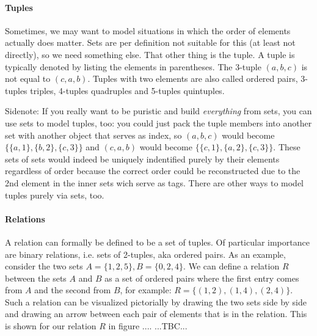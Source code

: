 \paragraph{Tuples}
Sometimes, we may want to model situations in which the order of elements actually does matter. Sets are per definition not suitable for this (at least not directly), so we need something else. That other thing is the tuple. A tuple is typically denoted by listing the elements in parentheses. The 3-tuple $(a,b,c)$ is not equal to $(c,a,b)$. Tuples with two elements are also called ordered pairs, 3-tuples triples, 4-tuples quadruples and 5-tuples quintuples.

\medskip 
Sidenote: If you really want to be puristic and build \emph{everything} from sets, you can use sets to model tuples, too: you could just pack the tuple members into another set with another object that serves as index, so $(a,b,c)$ would become $\{\{a,1\},\{b,2\},\{c,3\}\}$ and $(c,a,b)$ would become  $\{\{c,1\},\{a,2\},\{c,3\}\}$. These sets of sets would indeed be uniquely indentified purely by their elements regardless of order because the correct order could be reconstructed due to the 2nd element in the inner sets wich serve as tags. There are other ways to model tuples purely via sets, too.


\paragraph{Relations}
A relation can formally be defined to be a set of tuples. Of particular importance are binary relations, i.e. sets of 2-tuples, aka ordered pairs. As an example, consider the two sets $A = \{1,2,5\}, B = \{0,2,4\}$. We can define a relation $R$ between the sets $A$ and $B$ as a set of ordered pairs where the first entry comes from $A$ and the second from $B$, for example: $R = \{(1,2),(1,4),(2,4)\}$. Such a relation can be visualized pictorially by drawing the two sets side by side and drawing an arrow between each pair of elements that is in the relation. This is shown for our relation $R$ in figure .... ...TBC...

